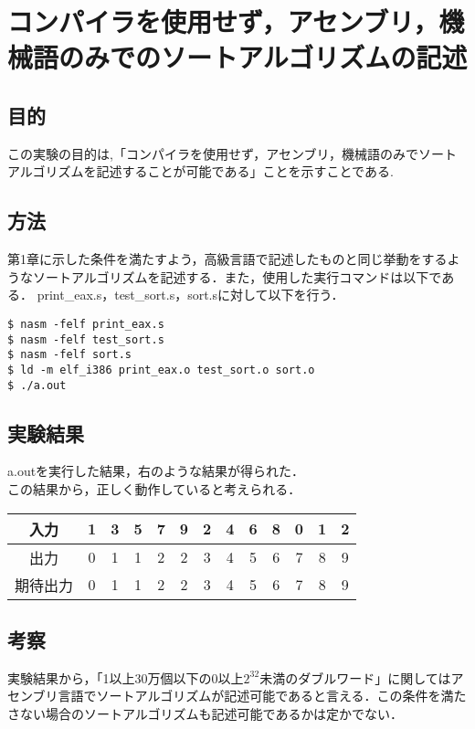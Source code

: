 \chapter{コンパイラを使用せず，アセンブリ，機械語のみでのソートアルゴリズムの記述}
\vspace{-1cm}
\section{目的}
この実験の目的は,「コンパイラを使用せず，アセンブリ，機械語のみでソートアルゴリズムを記述することが可能である」ことを示すことである.

\section{方法}
第1章に示した条件を満たすよう，高級言語で記述したものと同じ挙動をするようなソートアルゴリズムを記述する．また，使用した実行コマンドは以下である．
print\_eax.s，test\_sort.s，sort.sに対して以下を行う．
\begin{lstlisting}[numbers={none}, caption={実行コマンド}]
$ nasm -felf print_eax.s
$ nasm -felf test_sort.s
$ nasm -felf sort.s
$ ld -m elf_i386 print_eax.o test_sort.o sort.o
$ ./a.out
\end{lstlisting}

\section{実験結果}
\begin{table}[h]
  \centering
   \begin{minipage}{0.45\textwidth}
     a.outを実行した結果，右のような結果が得られた．\\
     この結果から，正しく動作していると考えられる．
   \end{minipage}
   \hfill
   \begin{minipage}{0.45\textwidth}
     \centering
     \begin{tabular}{c|cccccccccccc}
       入力 & 1 & 3 & 5 & 7 & 9 & 2 & 4 & 6 & 8 & 0 & 1 & 2\\\hline
       出力 & 0 & 1 & 1 & 2 & 2 & 3 & 4 & 5 & 6 & 7 & 8 & 9\\
       期待出力 & 0 & 1 & 1 & 2 & 2 & 3 & 4 & 5 & 6 & 7 & 8 & 9\\
     \end{tabular}
   \end{minipage}
\end{table}

\section{考察}
実験結果から，「1以上30万個以下の0以上$2^{32}$未満のダブルワード」に関してはアセンブリ言語でソートアルゴリズムが記述可能であると言える．この条件を満たさない場合のソートアルゴリズムも記述可能であるかは定かでない．
